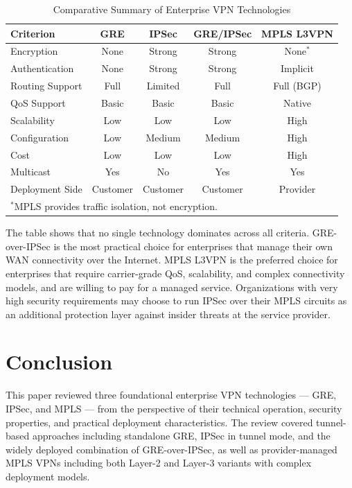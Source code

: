 \documentclass[conference]{IEEEtran}
\begin{document}
\begin{table}[htbp]
\caption{Comparative Summary of Enterprise VPN Technologies}
\label{tab:comparison}
\centering
\renewcommand{\arraystretch}{1.2}
\begin{tabular}{lcccc}
\toprule
\textbf{Criterion} & \textbf{GRE} & \textbf{IPSec} & \textbf{GRE/IPSec} & \textbf{MPLS L3VPN} \\
\midrule
Encryption        & None    & Strong  & Strong  & None$^{*}$  \\
Authentication    & None    & Strong  & Strong  & Implicit    \\
Routing Support   & Full    & Limited & Full    & Full (BGP)  \\
QoS Support       & Basic   & Basic   & Basic   & Native      \\
Scalability       & Low     & Low     & Low     & High        \\
Configuration     & Low     & Medium  & Medium  & High        \\
Cost              & Low     & Low     & Low     & High        \\
Multicast         & Yes     & No      & Yes     & Yes         \\
Deployment Side   & Customer& Customer& Customer& Provider    \\
\bottomrule
\multicolumn{5}{l}{$^{*}$MPLS provides traffic isolation, not encryption.}
\end{tabular}
\end{table}

The table shows that no single technology dominates across all
criteria. GRE-over-IPSec is the most practical choice for
enterprises that manage their own WAN connectivity over the
Internet. MPLS L3VPN is the preferred choice for enterprises that
require carrier-grade QoS, scalability, and complex connectivity
models, and are willing to pay for a managed service. Organizations
with very high security requirements may choose to run IPSec over
their MPLS circuits as an additional protection layer against
insider threats at the service provider.

\section{Conclusion}
\label{sec:conclusion}

This paper reviewed three foundational enterprise VPN technologies
--- GRE, IPSec, and MPLS --- from the perspective of their technical
operation, security properties, and practical deployment
characteristics. The review covered tunnel-based approaches
including standalone GRE, IPSec in tunnel mode, and the widely
deployed combination of GRE-over-IPSec, as well as provider-managed
MPLS VPNs including both Layer-2 and Layer-3 variants with complex
deployment models.
\end{document}
